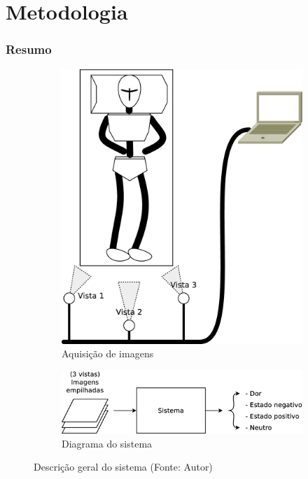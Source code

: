 \section{Metodologia}

\begin{frame}
\frametitle{Resumo}
\begin{figure}[h!]
\centering
\begin{subfigure}[b]{0.25\linewidth}
\includegraphics[width=\linewidth]{images/multiview.eps}
\caption{Aquisição de imagens}
\label{fig:multiview}
\end{subfigure}
\begin{subfigure}[b]{0.65\linewidth}
\includegraphics[width=\linewidth]{images/sistema.eps}
\vspace{1cm}
\caption{Diagrama do sistema}
\label{fig:sistema}
\end{subfigure}
\caption{Descrição geral do sistema (Fonte: Autor)}
\label{fig:sistematotal}
\end{figure} 
\end{frame}

